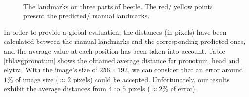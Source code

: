 \documentclass[review]{elsarticle}
\begin{document}
\begin{figure}[h!]
	\centering
    ~~
	~~
    \caption{The landmarks on three parts of beetle. The red/ yellow points present the predicted/ manual landmarks.}
    \label{figeb1}
\end{figure}

In order to provide a global evaluation, the distances (in pixels) have been calculated between the manual landmarks and the corresponding predicted ones, and the average value at each position has been taken into account. Table \ref{tblavgpronotum} shows the obtained average distance for pronotum, head and elytra. With the image's size of $256 \times 192$, we can consider that an error around $1\%$ of image size ($\approx 2$ pixels) could be accepted. Unfortunately, our results exhibit the average distances from $4$ to $5$ pixels ($\approx 2\%$ of error).
\end{document}
